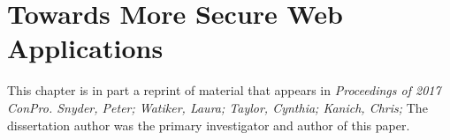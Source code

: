 \chapter{Towards More Secure Web Applications}
\label{future-web}

This chapter is in part a reprint of material that appears in
\textit{Proceedings of 2017 ConPro. Snyder, Peter;  Watiker, Laura; Taylor,
Cynthia; Kanich, Chris;} The dissertation author was the primary investigator and
author of this paper.






